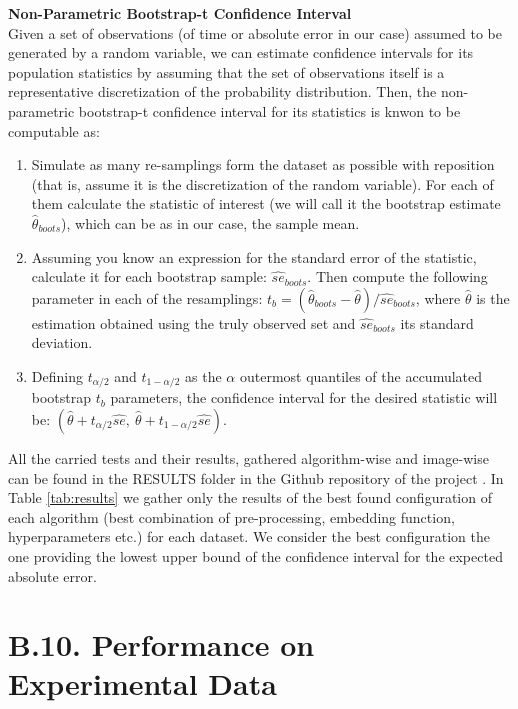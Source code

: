 \documentclass[11pt, a4paper, twoside]{article} %
\DeclareRobustCommand{\mybox}[2][gray!10]{%
\begin{tcolorbox}[   %
        left=0.2cm,
        right=0.2cm,
        top=0.15cm,
        bottom=0.15cm,
        colback=#1,
        colframe=#1,
        width=\dimexpr\textwidth\relax, 
        enlarge left by=0mm,
        boxsep=5pt,
        arc=0pt,outer arc=0pt,
        ]
        #2
\end{tcolorbox}
}
\begin{document}
\mybox{{\bf Non-Parametric Bootstrap-t Confidence Interval \vspace{0.12cm}}\\
Given a set of observations (of time or absolute error in our case) assumed to be generated by a random variable, we can estimate confidence intervals for its population statistics by assuming that the set of observations itself is a representative discretization of the probability distribution. Then, the non-parametric bootstrap-t confidence interval for its statistics is knwon  \cite{boots} to be computable as:
\begin{enumerate}
\item Simulate as many re-samplings form the dataset as possible with reposition (that is, assume it is the discretization of the random variable). For each of them calculate the statistic of interest (we will call it the bootstrap estimate $\hat{\theta}_{boots}$), which can be as in our case, the sample mean.
\item  Assuming you know an expression for the standard error of the statistic, calculate it for each bootstrap sample: $\hat{se}_{boots}$. Then compute the following parameter in each of the resamplings: $t_b=(\hat{\theta}_{boots}-\hat{\theta})/\hat{se}_{boots}$, where $\hat{\theta}$ is the estimation obtained using the truly observed set and $\hat{se}_{boots}$ its standard deviation.
\item  Defining $t_{\alpha/2}$ and $t_{1-\alpha/2}$ as the $\alpha$ outermost quantiles of the accumulated bootstrap $t_b$
parameters, the confidence interval for the desired statistic will be: $(\hat{\theta}+t_{\alpha/2}\hat{se},\ \hat{\theta}+t_{1-\alpha/2}\hat{se})$.
\end{enumerate}
}


All the carried tests and their results, gathered algorithm-wise and image-wise can be found in the RESULTS folder in the Github repository of the project \cite{github}. In Table \ref{tab:results} we gather only the results of the best found configuration of each algorithm (best combination of pre-processing, embedding function, hyperparameters etc.) for each dataset. We consider the best configuration the one providing the lowest upper bound of the confidence interval for the expected absolute error.

\section*{B.10. Performance on Experimental Data }
\end{document}
